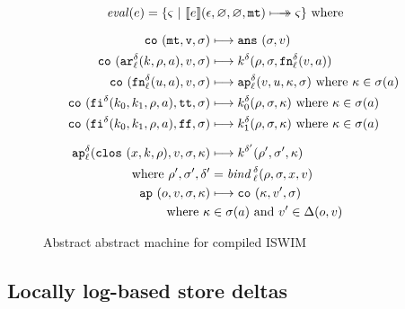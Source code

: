 \documentclass[preprint,onecolumn,9pt]{sigplanconf} %
\begin{document}
\begin{figure}
\begin{gather*}
\begin{align*}
\mathit{eval}(\mexp) &= \{ \mstate\ |\ \compile{\mexp}(\epsilon,\varnothing,\varnothing,\kmt) \multimachstep \mstate \} \text{ where }
\end{align*}
\\[2mm]
\begin{align*}
\co{\kmt,\mval,\msto} &\machstep
\ans{\msto,\mval}
\\
\co{\kar[^\mcntr_\mlab]{\mcomp,\menv,\maddr},\mval,\msto} & \machstep
\mcomp^\mcntr(\menv,\msto,\kfn[^\mcntr_\mlab]{\mval,\maddr})
\\
\co{\kfn[^\mcntr_\mlab]{{\mvalx{u}},\maddr},\mval,\msto} & \machstep
\ap[^\mcntr_\mlab]{\mval,\mvalx{u},\mkont,\msto}
\text{ where }\mkont \in \msto(\maddr)
\\
\co{\kif[^\mcntr]{\mcompi0,\mcompi1,\menv,\maddr},\strue,\msto} & \machstep
\mcompi0^\mcntr(\menv,\msto,\mkont)
\text{ where }\mkont\in\msto(\maddr)
\\
\co{\kif[^\mcntr]{\mcompi0,\mcompi1,\menv,\maddr},\sfalse,\msto} & \machstep
\mcompi1^\mcntr(\menv,\msto,\mkont)
\text{ where }\mkont\in\msto(\maddr)
\\[2mm]
\ap[^\mcntr_\mlab]{\clos{\mvar,\mcomp,\menv},\mval,\msto,\mkont} & \machstep
\mcomp^{\mcntr'}(\menv',\msto',\mkont) \\
\text{ where }\menv',\msto',\mcntr' &= \mathit{bind\,}^{ \mcntr}_\mlab(\menv,\msto,\mvar,\mval)
\\
\ap{\mop,\mval,\msto,\mkont} & \machstep
\co{\mkont,\mval',\msto} \\
\text{ where }\mkont &\in\msto(\maddr)
\text{ and } \mval'\in\interpdelta(\mop,\mval)
\end{align*}
\end{gather*}
\caption{Abstract abstract machine for compiled ISWIM}
\label{fig:caam}
\end{figure}




\subsection{Locally log-based store deltas}
\end{document}
